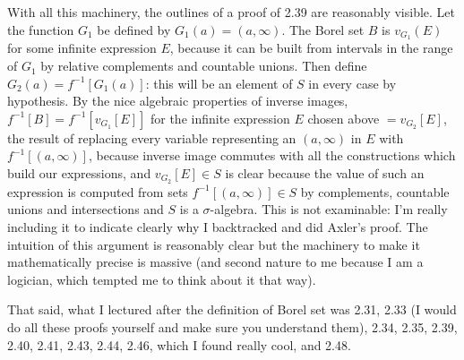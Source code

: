 \documentclass[12pt]{article}
\begin{document}
With all this machinery, the outlines of a proof of 2.39 are reasonably visible.  Let the function $G_1$ be defined by $G_1(a) = (a,\infty)$.  The Borel set $B$ is
$v_{G_1}(E)$ for some infinite expression $E$, because it can be built from intervals in the range of $G_1$ by relative complements and countable unions.  Then define $G_2(a) = f^{-1}[G_1(a)]$:  this will be an element of $S$ in every case by hypothesis.  By the nice algebraic properties of inverse images, $f^{-1}[B] = f^{-1}[v_{G_1}[E]]$ for the infinite expression $E$ chosen above $= v_{G_2}[E]$, the result of replacing every variable representing an $(a,\infty)$ in $E$ with $f^{-1}[(a,\infty)]$, because inverse image commutes with all the constructions which build our expressions, and  $v_{G_2}[E]\in S$ is clear because the value of such an expression is computed from sets $f^{-1}[(a,\infty)]\in S$ by complements, countable unions and intersections and $S$ is a $\sigma$-algebra.  This is not examinable:  I'm really including it to indicate clearly why I backtracked and did Axler's proof.  The intuition of this argument is reasonably clear but the machinery to make it mathematically precise is massive (and second nature to me because I am a logician, which tempted me to think about it that way).

That said, what I lectured after the definition of Borel set was 2.31, 2.33 (I would do all these proofs yourself and make sure you understand them), 2.34, 2.35, 2.39, 2.40, 2.41, 2.43, 2.44, 2.46, which I found really cool,  and 2.48.
\end{document}
